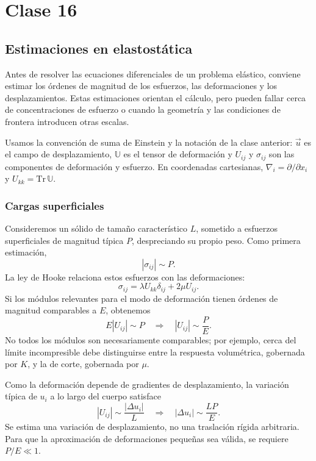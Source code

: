 \chapter{Clase 16}

\section{Estimaciones en elastostática}

Antes de resolver las ecuaciones diferenciales de un problema elástico, conviene estimar los órdenes de magnitud de los esfuerzos, las deformaciones y los desplazamientos. Estas estimaciones orientan el cálculo, pero pueden fallar cerca de concentraciones de esfuerzo o cuando la geometría y las condiciones de frontera introducen otras escalas.

Usamos la convención de suma de Einstein y la notación de la clase anterior: $\vec u$ es el campo de desplazamiento, $\mathbb U$ es el tensor de deformación y $U_{ij}$ y $\sigma_{ij}$ son las componentes de deformación y esfuerzo. En coordenadas cartesianas, $\nabla_i=\partial/\partial x_i$ y $U_{kk}=\mathrm{Tr}\,\mathbb U$.

\subsection{Cargas superficiales}

Consideremos un sólido de tamaño característico $L$, sometido a esfuerzos superficiales de magnitud típica $P$, despreciando su propio peso. Como primera estimación,
\[
|\sigma_{ij}|\sim P.
\]
La ley de Hooke relaciona estos esfuerzos con las deformaciones:
\[
\sigma_{ij}=\lambda U_{kk}\delta_{ij}+2\mu U_{ij}.
\]
Si los módulos relevantes para el modo de deformación tienen órdenes de magnitud comparables a $E$, obtenemos
\[
E|U_{ij}|\sim P
\quad\Longrightarrow\quad
\boxed{|U_{ij}|\sim\frac{P}{E}}.
\]
No todos los módulos son necesariamente comparables; por ejemplo, cerca del límite incompresible debe distinguirse entre la respuesta volumétrica, gobernada por $K$, y la de corte, gobernada por $\mu$.

Como la deformación depende de gradientes de desplazamiento, la variación típica de $u_i$ a lo largo del cuerpo satisface
\[
|U_{ij}|\sim\frac{|\Delta u_i|}{L}
\quad\Longrightarrow\quad
\boxed{|\Delta u_i|\sim\frac{LP}{E}}.
\]
Se estima una variación de desplazamiento, no una traslación rígida arbitraria. Para que la aproximación de deformaciones pequeñas sea válida, se requiere $P/E\ll1$.

